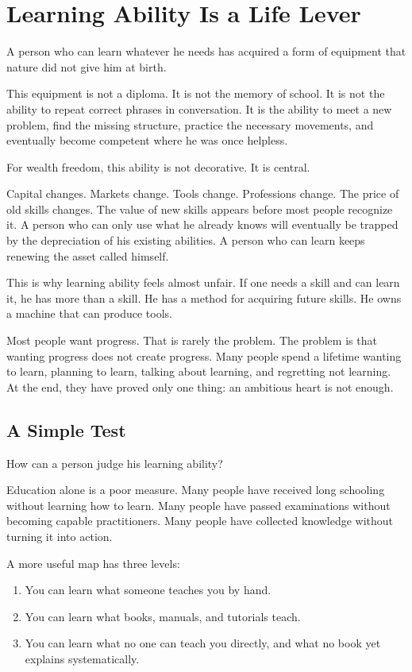 \chapter{Learning Ability Is a Life Lever}

A person who can learn whatever he needs has acquired a form of equipment that nature did not give him at birth.

This equipment is not a diploma. It is not the memory of school. It is not the ability to repeat correct phrases in conversation. It is the ability to meet a new problem, find the missing structure, practice the necessary movements, and eventually become competent where he was once helpless.

For wealth freedom, this ability is not decorative. It is central.

Capital changes. Markets change. Tools change. Professions change. The price of old skills changes. The value of new skills appears before most people recognize it. A person who can only use what he already knows will eventually be trapped by the depreciation of his existing abilities. A person who can learn keeps renewing the asset called himself.

This is why learning ability feels almost unfair. If one needs a skill and can learn it, he has more than a skill. He has a method for acquiring future skills. He owns a machine that can produce tools.

Most people want progress. That is rarely the problem. The problem is that wanting progress does not create progress. Many people spend a lifetime wanting to learn, planning to learn, talking about learning, and regretting not learning. At the end, they have proved only one thing: an ambitious heart is not enough.

\section*{A Simple Test}

How can a person judge his learning ability?

Education alone is a poor measure. Many people have received long schooling without learning how to learn. Many people have passed examinations without becoming capable practitioners. Many people have collected knowledge without turning it into action.

A more useful map has three levels:

\begin{enumerate}
\item You can learn what someone teaches you by hand.
\item You can learn what books, manuals, and tutorials teach.
\item You can learn what no one can teach you directly, and what no book yet explains systematically.
\end{enumerate}

